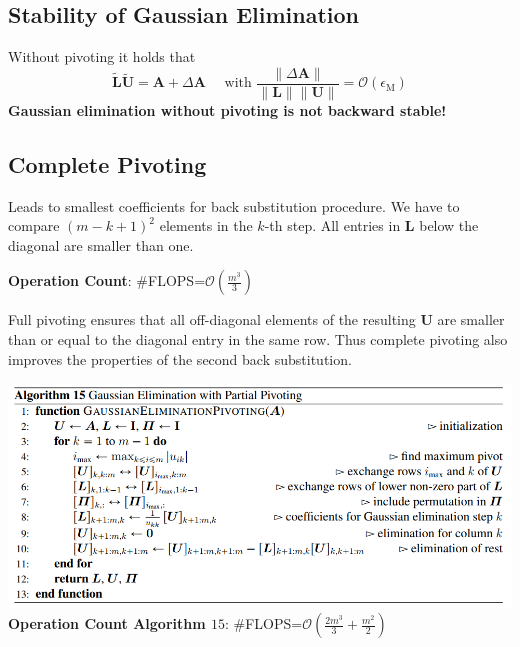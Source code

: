 \documentclass[english]{latex4ei/latex4ei_sheet}
\begin{document}
\begin{sectionbox}
    \begin{sectionbox}
        \subsection{Stability of Gaussian Elimination}
        Without pivoting it holds that
        $$\tilde{\mathbf{L}}\tilde{\mathbf{U}} = \mathbf{A} + \Delta\mathbf{A}\quad \text{ with } \frac{\parallel \Delta \mathbf{A} \parallel}{\parallel\mathbf{L}\parallel\parallel\mathbf{U}\parallel} = \mathcal{O}(\epsilon_\text{M})$$
        \textbf{Gaussian elimination without pivoting is not backward stable!}
    \end{sectionbox}
    \subsection{Complete Pivoting}
    Leads to smallest coefficients for back substitution procedure. We have to compare $(m-k+1)^2$ elements in the $k$-th step. All entries in $\mathbf{L}$ below the diagonal are smaller than one.
    \begin{emphbox}
        \large \textbf{Operation Count}: \#FLOPS=$\mathcal{O}(\frac{m^3}{3})$\\
    \end{emphbox}
    Full pivoting ensures that all off-diagonal elements of the resulting $\mathbf{U}$ are smaller than or equal to the diagonal entry in the same row. Thus complete pivoting also improves the properties of the second back substitution.
\end{sectionbox}
\begin{sectionbox}
    \includegraphics[width=\textwidth]{img/algo15_gauss_partial_pivoting.png}
    \textbf{Operation Count Algorithm $15$}: \#FLOPS=$\mathcal{O}(\frac{2m^3}{3} + \frac{m^2}{2})$\\
\end{sectionbox}
\end{document}

